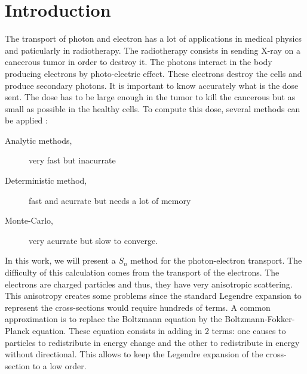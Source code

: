 \section{Introduction}
The transport of photon and electron has a lot of applications in medical
physics and paticularly in radiotherapy. The radiotherapy consists in sending
X-ray on a cancerous tumor in order to destroy it. The photons interact in the
body producing electrons by photo-electric effect. These electrons destroy the
cells and produce secondary photons. It is important to know accurately what
is the dose sent. The dose has to be large enough in the tumor to kill the
cancerous but as small as possible in the healthy cells. To compute this dose,
several methods can be applied :
\begin{description}
\item[Analytic methods,] very fast but inacurrate
\item[Deterministic method,] fast and acurrate but needs a lot of memory
\item[Monte-Carlo,] very acurrate but slow to converge.
\end{description}
In this work, we will present a $S_n$ method for the photon-electron
transport. The difficulty of this calculation comes from the transport of the
electrons. The electrons are charged particles and thus, they have very
anisotropic scattering. This anisotropy creates some problems since the
standard Legendre expansion to represent the cross-sections would require
hundreds of terms. A common approximation is to replace the Boltzmann equation
by the Boltzmann-Fokker-Planck equation. These equation consists in adding in
2 terms: one causes to particles to redistribute in energy change and the
other to redistribute in energy without directional\cite{morel_81}. This
allows to keep the Legendre expansion of the cross-section to a low order.
